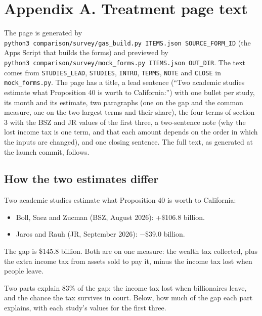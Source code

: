 \section{Appendix A. Treatment page text}\label{appendix-a.-treatment-page-text}

The page is generated by \texttt{python3\ comparison/survey/gas\_build.py\ ITEMS.json\ SOURCE\_FORM\_ID} (the
Apps Script that builds the forms) and previewed by \texttt{python3\ comparison/survey/mock\_forms.py\ ITEMS.json\ OUT\_DIR}. The text comes from \texttt{STUDIES\_LEAD}, \texttt{STUDIES}, \texttt{INTRO}, \texttt{TERMS}, \texttt{NOTE} and \texttt{CLOSE} in
\texttt{mock\_forms.py}. The page has a title, a lead sentence (``Two academic studies estimate what
Proposition 40 is worth to California:'') with one bullet per study, its month and its estimate,
two paragraphs (one on the gap and the common measure, one on the two largest terms and their
share), the four
terms of section 3 with the BSZ and JR values of the first three, a two-sentence note (why the
lost income tax is one term, and that each amount depends on the order in which the inputs are
changed), and one closing sentence. The full text, as generated at the launch commit, follows.

\subsection{How the two estimates differ}\label{how-the-two-estimates-differ}

Two academic studies estimate what Proposition 40 is worth to California:

\begin{itemize}
\tightlist
\item
  Boll, Saez and Zucman (BSZ, August 2026): +\$106.8 billion.
\item
  Jaros and Rauh (JR, September 2026): −\$39.0 billion.
\end{itemize}

The gap is \$145.8 billion. Both are on one measure: the wealth tax collected, plus the extra income tax from assets sold to pay it, minus the income tax lost when people leave.

Two parts explain 83\% of the gap: the income tax lost when billionaires leave, and the chance the tax survives in court. Below, how much of the gap each part explains, with each study's values for the first three.

